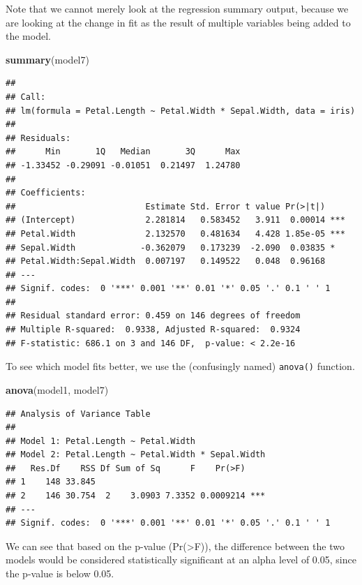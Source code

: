 \documentclass[
]{book}
\newenvironment{Shaded}{\begin{snugshade}}{\end{snugshade}}
\newcommand{\FunctionTok}[1]{\textcolor[rgb]{0.13,0.29,0.53}{\textbf{#1}}}
\newcommand{\NormalTok}[1]{#1}
\begin{document}
Note that we cannot merely look at the regression summary output, because we are looking at the change in fit as the result of multiple variables being added to the model.

\begin{Shaded}
\begin{Highlighting}[]
\FunctionTok{summary}\NormalTok{(model7)}
\end{Highlighting}
\end{Shaded}

\begin{verbatim}
## 
## Call:
## lm(formula = Petal.Length ~ Petal.Width * Sepal.Width, data = iris)
## 
## Residuals:
##      Min       1Q   Median       3Q      Max 
## -1.33452 -0.29091 -0.01051  0.21497  1.24780 
## 
## Coefficients:
##                          Estimate Std. Error t value Pr(>|t|)    
## (Intercept)              2.281814   0.583452   3.911  0.00014 ***
## Petal.Width              2.132570   0.481634   4.428 1.85e-05 ***
## Sepal.Width             -0.362079   0.173239  -2.090  0.03835 *  
## Petal.Width:Sepal.Width  0.007197   0.149522   0.048  0.96168    
## ---
## Signif. codes:  0 '***' 0.001 '**' 0.01 '*' 0.05 '.' 0.1 ' ' 1
## 
## Residual standard error: 0.459 on 146 degrees of freedom
## Multiple R-squared:  0.9338, Adjusted R-squared:  0.9324 
## F-statistic: 686.1 on 3 and 146 DF,  p-value: < 2.2e-16
\end{verbatim}

To see which model fits better, we use the (confusingly named) \texttt{anova()} function.

\begin{Shaded}
\begin{Highlighting}[]
\FunctionTok{anova}\NormalTok{(model1, model7)}
\end{Highlighting}
\end{Shaded}

\begin{verbatim}
## Analysis of Variance Table
## 
## Model 1: Petal.Length ~ Petal.Width
## Model 2: Petal.Length ~ Petal.Width * Sepal.Width
##   Res.Df    RSS Df Sum of Sq      F    Pr(>F)    
## 1    148 33.845                                  
## 2    146 30.754  2    3.0903 7.3352 0.0009214 ***
## ---
## Signif. codes:  0 '***' 0.001 '**' 0.01 '*' 0.05 '.' 0.1 ' ' 1
\end{verbatim}

We can see that based on the p-value (Pr(\textgreater F)), the difference between the two models would be considered statistically significant at an alpha level of 0.05, since the p-value is below 0.05.
\end{document}
